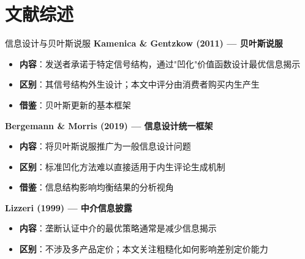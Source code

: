 \documentclass[aspectratio=169,10pt]{beamer}
\newcommand{\pos}[1]{\textcolor{positive}{#1}}
\newcommand{\HL}[1]{\textcolor{emphasis}{#1}}
\begin{document}
\section{文献综述}

\begin{frame}{信息设计与贝叶斯说服}
\small
\textbf{Kamenica \& Gentzkow (2011) — 贝叶斯说服}
\begin{itemize}
    \item \textbf{内容}：发送者承诺于特定信号结构，通过"凹化"价值函数设计最优信息揭示
    \item \textbf{区别}：其信号结构外生设计；本文中评分由消费者购买\HL{内生产生}
    \item \textbf{借鉴}：贝叶斯更新的基本框架
\end{itemize}

\vspace{6pt}
\textbf{Bergemann \& Morris (2019) — 信息设计统一框架}
\begin{itemize}
    \item \textbf{内容}：将贝叶斯说服推广为一般信息设计问题
    \item \textbf{区别}：标准凹化方法难以直接适用于内生评论生成机制
    \item \textbf{借鉴}：信息结构影响均衡结果的分析视角
\end{itemize}

\vspace{6pt}
\textbf{Lizzeri (1999) — 中介信息披露}
\begin{itemize}
    \item \textbf{内容}：垄断认证中介的最优策略通常是减少信息揭示
    \item \textbf{区别}：不涉及多产品定价；本文关注粗糙化如何影响\pos{差别定价能力}
\end{itemize}
\end{frame}
\end{document}
